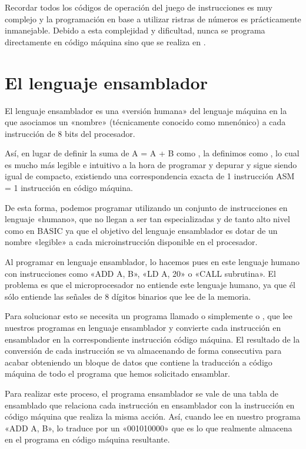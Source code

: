 \documentclass[letterpaper,10pt,spanish]{sphinxmanual}
\begin{document}
Recordar todos los códigos de operación del juego de instrucciones es muy complejo y la programación en base a utilizar ristras de números es prácticamente inmanejable. Debido a esta complejidad y dificultad, nunca se programa directamente en código máquina sino que se realiza en .


\section{El lenguaje ensamblador}
\label{\detokenize{02_introduccion/introduccion:el-lenguaje-ensamblador}}
El lenguaje ensamblador es una «versión humana» del lenguaje máquina en la que asociamos un «nombre» (técnicamente conocido como mnenónico) a cada instrucción de 8 bits del procesador.

Así, en lugar de definir la suma de A = A + B como , la definimos como , lo cual es mucho más legible e intuitivo a la hora de programar y depurar y sigue siendo igual de compacto, existiendo una correspondencia exacta de 1 instrucción ASM = 1 instrucción en código máquina.

De esta forma, podemos programar utilizando un conjunto de instrucciones en lenguaje «humano», que no llegan a ser tan especializadas y de tanto alto nivel como en BASIC ya que el objetivo del lenguaje ensamblador es dotar de un nombre «legible» a cada microinstrucción disponible en el procesador.

Al programar en lenguaje ensamblador, lo hacemos pues en este lenguaje humano con instrucciones como «ADD A, B», «LD A, 20» o «CALL subrutina». El problema es que el microprocesador no entiende este lenguaje humano, ya que él sólo entiende las señales de 8 dígitos binarios que lee de la memoria.

Para solucionar esto se necesita un programa llamado  o simplemente  o , que lee nuestros programas en lenguaje ensamblador y convierte cada instrucción en ensamblador en la correspondiente instrucción código máquina. El resultado de la conversión de cada instrucción se va almacenando de forma consecutiva para acabar obteniendo un bloque de datos que contiene la traducción a código máquina de todo el programa que hemos solicitado ensamblar.

Para realizar este proceso, el programa ensamblador se vale de una tabla de ensamblado que relaciona cada instrucción en ensamblador con la instrucción en código máquina que realiza la misma acción. Así, cuando lee en nuestro programa «ADD A, B», lo traduce por un «001010000» que es lo que realmente almacena en el programa en código máquina resultante.
\end{document}
